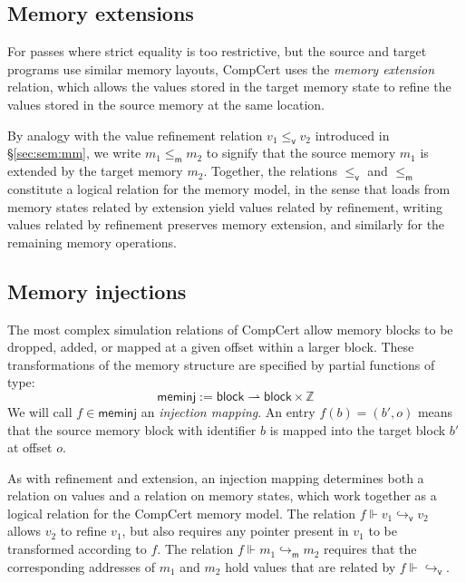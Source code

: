 \documentclass[11pt,oneside,draft]{book}
\theoremstyle{definition}
\newcommand{\kw}[1]{\ensuremath{ \mathsf{#1} }}
\newcommand{\vref}{\le_\kw{v}}   %
\newcommand{\mext}{\le_\kw{m}}   %
\begin{document}
\subsection{Memory extensions} \label{sec:memext} %

For passes where strict equality is too restrictive,
but the source and target programs
use similar memory layouts,
CompCert uses the \emph{memory extension} relation,
which allows the values
stored in the target memory state to refine
the values stored in the source memory at the same location.

By analogy with
the value refinement relation $v_1 \vref v_2$
introduced in \S\ref{sec:sem:mm},
we write $m_1 \mext m_2$ to signify that
the source memory $m_1$ is extended by
the target memory $m_2$.
Together,
the relations $\vref$ and $\mext$
constitute a logical relation for the memory model,
in the sense that
loads from memory states related by extension
yield values related by refinement,
writing values related by refinement
preserves memory extension,
and similarly for the remaining memory operations.


\subsection{Memory injections} \label{sec:meminj} %

The most complex simulation relations of CompCert
allow memory blocks to be dropped, added, or
mapped at a given offset within a larger block.
These transformations of the memory structure
are specified by partial functions of type:
\[
  \kw{meminj} := \kw{block} \rightharpoonup \kw{block} \times \mathbb{Z}
\]
We will call $f \in \kw{meminj}$
an \emph{injection mapping}.
An entry $f(b) = (b', o)$
means that the source memory block with identifier $b$
is mapped into the target block $b'$
at offset $o$.

As with refinement and extension,
an injection mapping determines both
a relation on values and
a relation on memory states,
which work together
as a logical relation for the CompCert memory model.
The relation $f \Vdash v_1 \hookrightarrow_\kw{v} v_2$
allows $v_2$ to refine $v_1$,
but also requires any pointer present in $v_1$ 
to be transformed according to $f$.
The relation $f \Vdash m_1 \hookrightarrow_\kw{m} m_2$
requires that the corresponding addresses of $m_1$ and $m_2$
hold values that are related by $f \Vdash {\hookrightarrow_\kw{v}}$.
\end{document}

